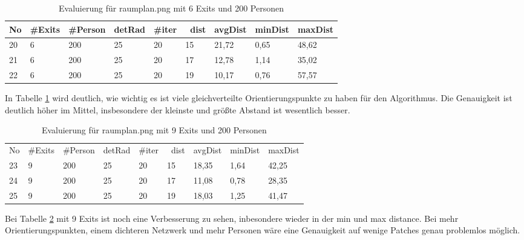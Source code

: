 \begin{table}[h]
\begin{tabular}{|l|l|l|l|l|l|l|l|l|}
\hline
No & \#Exits & \#Person & detRad & \#iter & ~dist & avgDist & minDist & maxDist \\ \hline
20 & 6       & 200      & 25     & 20     & 15    & 21,72   & 0,65    & 48,62   \\ \hline
21 & 6       & 200      & 25     & 20     & 17    & 12,78   & 1,14    & 35,02   \\ \hline
22 & 6       & 200      & 25     & 20     & 19    & 10,17   & 0,76    & 57,57   \\ \hline
\end{tabular}
\caption{Evaluierung für raumplan.png mit 6 Exits und 200 Personen}
\label{fig:eva04}
\end{table}

In Tabelle \ref{fig:eva04} wird deutlich, wie wichtig es ist viele gleichverteilte Orientierungspunkte zu haben für den Algorithmus. Die Genauigkeit ist deutlich höher im Mittel, insbesondere der kleinste und größte Abstand ist wesentlich besser.

\begin{table}[h]
\begin{tabular}{l|l|l|l|l|l|l|l|l|}
\cline{2-9}
No & \#Exits & \#Person & detRad & \#iter & ~dist & avgDist & minDist & maxDist \\ \cline{2-9} 
23 & 9       & 200      & 25     & 20     & 15    & 18,35   & 1,64    & 42,25   \\ \cline{2-9} 
24 & 9       & 200      & 25     & 20     & 17    & 11,08   & 0,78    & 28,35   \\ \cline{2-9} 
25 & 9       & 200      & 25     & 20     & 19    & 18,03   & 1,25    & 41,47   \\ \cline{2-9} 
\end{tabular}
\caption{Evaluierung für raumplan.png mit 9 Exits und 200 Personen}
\label{fig:eva05}
\end{table}

Bei Tabelle \ref{fig:eva05} mit 9 Exits ist noch eine Verbesserung zu sehen, inbesondere wieder in der min und max distance. Bei mehr Orientierungspunkten, einem dichteren Netzwerk und mehr Personen wäre eine Genauigkeit auf wenige Patches genau problemlos möglich.
